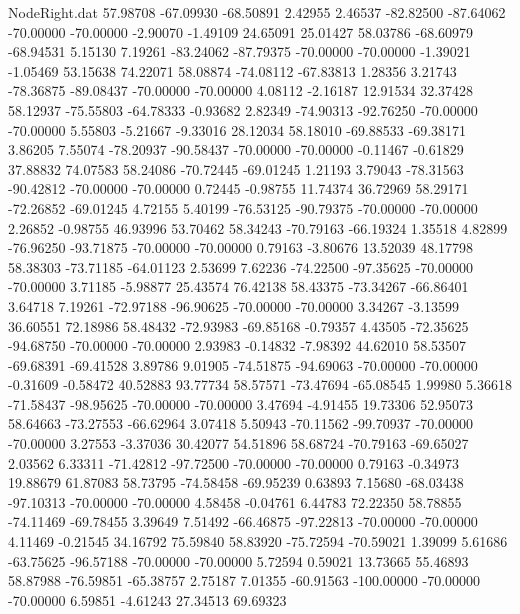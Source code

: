 \begin{filecontents}{NodeRight.dat}
  57.98708  -67.09930  -68.50891     2.42955    2.46537  -82.82500  -87.64062  -70.00000  -70.00000   -2.90070   -1.49109   24.65091   25.01427
  58.03786  -68.60979  -68.94531     5.15130    7.19261  -83.24062  -87.79375  -70.00000  -70.00000   -1.39021   -1.05469   53.15638   74.22071
  58.08874  -74.08112  -67.83813     1.28356    3.21743  -78.36875  -89.08437  -70.00000  -70.00000    4.08112   -2.16187   12.91534   32.37428
  58.12937  -75.55803  -64.78333    -0.93682    2.82349  -74.90313  -92.76250  -70.00000  -70.00000    5.55803   -5.21667   -9.33016   28.12034
  58.18010  -69.88533  -69.38171     3.86205    7.55074  -78.20937  -90.58437  -70.00000  -70.00000   -0.11467   -0.61829   37.88832   74.07583
  58.24086  -70.72445  -69.01245     1.21193    3.79043  -78.31563  -90.42812  -70.00000  -70.00000    0.72445   -0.98755   11.74374   36.72969
  58.29171  -72.26852  -69.01245     4.72155    5.40199  -76.53125  -90.79375  -70.00000  -70.00000    2.26852   -0.98755   46.93996   53.70462
  58.34243  -70.79163  -66.19324     1.35518    4.82899  -76.96250  -93.71875  -70.00000  -70.00000    0.79163   -3.80676   13.52039   48.17798
  58.38303  -73.71185  -64.01123     2.53699    7.62236  -74.22500  -97.35625  -70.00000  -70.00000    3.71185   -5.98877   25.43574   76.42138
  58.43375  -73.34267  -66.86401     3.64718    7.19261  -72.97188  -96.90625  -70.00000  -70.00000    3.34267   -3.13599   36.60551   72.18986
  58.48432  -72.93983  -69.85168    -0.79357    4.43505  -72.35625  -94.68750  -70.00000  -70.00000    2.93983   -0.14832   -7.98392   44.62010
  58.53507  -69.68391  -69.41528     3.89786    9.01905  -74.51875  -94.69063  -70.00000  -70.00000   -0.31609   -0.58472   40.52883   93.77734
  58.57571  -73.47694  -65.08545     1.99980    5.36618  -71.58437  -98.95625  -70.00000  -70.00000    3.47694   -4.91455   19.73306   52.95073
  58.64663  -73.27553  -66.62964     3.07418    5.50943  -70.11562  -99.70937  -70.00000  -70.00000    3.27553   -3.37036   30.42077   54.51896
  58.68724  -70.79163  -69.65027     2.03562    6.33311  -71.42812  -97.72500  -70.00000  -70.00000    0.79163   -0.34973   19.88679   61.87083
  58.73795  -74.58458  -69.95239     0.63893    7.15680  -68.03438  -97.10313  -70.00000  -70.00000    4.58458   -0.04761    6.44783   72.22350
  58.78855  -74.11469  -69.78455     3.39649    7.51492  -66.46875  -97.22813  -70.00000  -70.00000    4.11469   -0.21545   34.16792   75.59840
  58.83920  -75.72594  -70.59021     1.39099    5.61686  -63.75625  -96.57188  -70.00000  -70.00000    5.72594    0.59021   13.73665   55.46893
  58.87988  -76.59851  -65.38757     2.75187    7.01355  -60.91563 -100.00000  -70.00000  -70.00000    6.59851   -4.61243   27.34513   69.69323

\end{filecontents}
